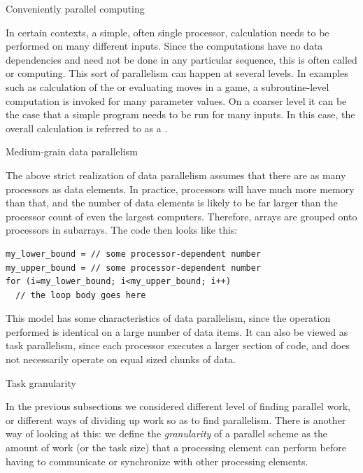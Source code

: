 
 {Conveniently parallel computing}

In certain contexts, a simple, often single processor, calculation needs to
be performed on many different inputs.
%
Since the computations have no data dependencies and
need not be done in any particular sequence, this is often called
 or  computing.
%
This sort of parallelism can happen at several levels. In examples
such as calculation of the  or evaluating
moves in a  game, a subroutine-level computation is
invoked for many parameter values.
% 
On a coarser level it can be the case that a simple program needs to
be run for many inputs. In this case, the overall calculation
is referred to as a . 

 {Medium-grain data parallelism}
\label{sec:medium-grain}

The above strict realization of data parallelism assumes that there
are as many processors as data elements. In practice, processors will
have much more memory than that, and the number of data elements is
likely to be far larger than the processor count of even the largest
computers. Therefore, arrays are grouped onto processors in subarrays.
The code then looks like this:
\begin{verbatim}
my_lower_bound = // some processor-dependent number
my_upper_bound = // some processor-dependent number
for (i=my_lower_bound; i<my_upper_bound; i++)
  // the loop body goes here
\end{verbatim}

This model has some characteristics of data parallelism, since the
operation performed is identical on a large number of data items. It
can also be viewed as task parallelism, since each processor executes
a larger section of code, and does not necessarily operate on equal
sized chunks of data.

 {Task granularity}

In the previous subsections we considered different level of finding
parallel work, or different ways of dividing up work so as to find
parallelism. There is another way of looking at this: we define
the \emph{granularity} of a parallel scheme as the amount of work (or
the task size) that a processing element can perform before having to
communicate or synchronize with other processing elements.

